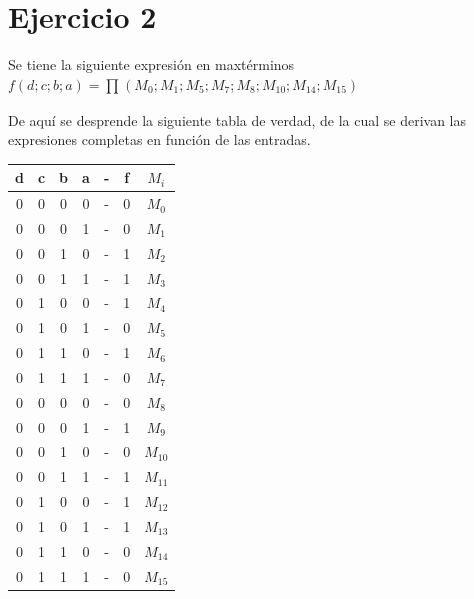 \documentclass[../../informe/src/main.tex]{subfiles}
\begin{document}
	\section{Ejercicio 2}
	Se tiene la siguiente expresión en maxtérminos $f(d;c;b;a) = \prod_{}^{}(M_{0};M_{1};M_{5};M_{7};M_{8};M_{10};M_{14};M_{15})$ \par
	De aquí se desprende la siguiente tabla de verdad, de la cual se derivan las expresiones completas en función de las entradas.
	\begin{table}[H]
		\centering
 			\begin{tabular}{||c c c c c c c||} 
 				\hline
				d & c & b & a & - & f & $M_{i}$\\ [0.5ex] 
 				\hline\hline
 					0 & 0 & 0 & 0 & - & 0 & $M_{0}$ \\
 					0 & 0 & 0 & 1 & - & 0 & $M_{1}$ \\
 					0 & 0 & 1 & 0 & - & 1 & $M_{2}$ \\
 					0 & 0 & 1 & 1 & - & 1 & $M_{3}$ \\
 					0 & 1 & 0 & 0 & - & 1 & $M_{4}$ \\
 					0 & 1 & 0 & 1 & - & 0 & $M_{5}$ \\
 					0 & 1 & 1 & 0 & - & 1 & $M_{6}$ \\
 					0 & 1 & 1 & 1 & - & 0 & $M_{7}$ \\
 					0 & 0 & 0 & 0 & - & 0 & $M_{8}$ \\
 					0 & 0 & 0 & 1 & - & 1 & $M_{9}$ \\
 					0 & 0 & 1 & 0 & - & 0 & $M_{10}$ \\
 					0 & 0 & 1 & 1 & - & 1 & $M_{11}$ \\
 					0 & 1 & 0 & 0 & - & 1 & $M_{12}$ \\
 					0 & 1 & 0 & 1 & - & 1 & $M_{13}$ \\
 					0 & 1 & 1 & 0 & - & 0 & $M_{14}$ \\
 					0 & 1 & 1 & 1 & - & 0 & $M_{15}$ \\ [1ex] 
 				\hline
  	\end{tabular}
	\end{table} \par
	
\end{document}
